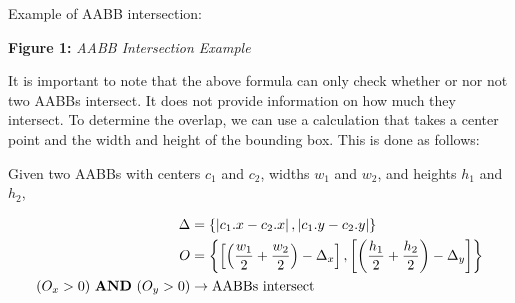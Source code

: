 \documentclass{article}
\newcommand{\drawaxesgrid}[2]{
    \draw[thick,->] (0,0) -- (#1,0) node[anchor=west] {\scriptsize x};
    \draw[thick,->] (0,0) -- (0,#2) node[anchor=north] {\scriptsize y};

    \pgfmathtruncatemacro{\xtickstop}{#1-1}
    \pgfmathtruncatemacro{\ytickstop}{#2-1}

    \filldraw [black] (0, 0) circle (5pt) {};

    \foreach \x in {1,...,\xtickstop}
    \draw (\x,0.1) -- (\x,-0.1) node[anchor=south] {\scriptsize \x};

    \foreach \y in {1,...,\ytickstop}
    \draw (0.1,\y) -- (-0.1,\y) node[anchor=east] {\scriptsize \y};

    \foreach \x in {1,...,\xtickstop}
    \draw[lightgray,dashed] (\x,0) -- (\x,#2);
    \foreach \y in {1,...,\ytickstop}
    \draw[lightgray,dashed] (0,\y) -- (#1,\y);
}
\renewcommand{\land}{\,\,\textrm{\textbf{AND}}\,\,}
\begin{document}
Example of AABB intersection:
\begin{center}
\end{center}

\begin{center}
    \textbf{Figure 1:} \textit{AABB Intersection Example}

\end{center}

It is important to note that the above formula can only check whether or nor
not two AABBs intersect. It does not provide information on how much they
intersect. To determine the overlap, we can use a calculation that takes a
center point and the width and height of the bounding box. This is done as
follows:

Given two AABBs with centers $c_1$ and $c_2$, widths $w_1$ and $w_2$, and
heights $h_1$ and $h_2$,

\begin{equation}
    \begin{aligned}
        \Delta                        & = \left\{ \left| c_1.x - c_2.x \right| , \left| c_1.y - c_2.y \right| \right\}                                                                                     \\
        O                             & = \left\{ \left[ \left( \frac{w_1}{2} + \frac{w_2}{2} \right) - \Delta_x \right] , \left[ \left( \frac{h_1}{2} + \frac{h_2}{2} \right) - \Delta_y \right] \right\} \\
        ( O_x > 0 ) \land ( O_y > 0 ) & \rightarrow \text{AABBs intersect}
    \end{aligned}
\end{equation}
\end{document}
